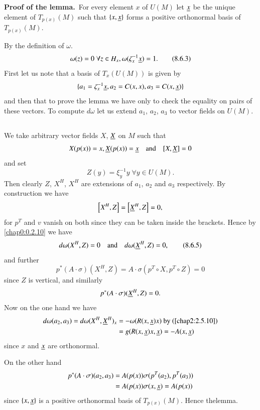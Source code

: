 \noindent
{\bf Proof of the lemma.}~For every element $x$ of $U(M)$ let $\underline{x}$
be the unique element of $T_{p(x)}(M)$ such that $\{x,\underline{x}\}$ forms
a positive orthonormal basis of $T_{p(x)}(M)$.

By the definition of $\omega$.
\begin{equation*}
\omega(z)=0 \; \forall z\in
H_{x},\omega(\zeta^{-1}_{x}\underline{x})=1.\tag{8.6.3}\label{chap8:8.6.3} 
\end{equation*}
First let us note that a basis of $T_{x}(U(M))$ is given by
$$
\{a_{1}=\zeta^{-1}_{x}\underline{x},a_{2}=C(x,x),a_{3}=C(x,\underline{x})\}
$$
and then that to prove the lemma we have only to check the equality on
pairs of these vectors. To compute $d\omega$ let us extend $a_{1}$,
$a_{2}$, $a_{3}$ to vector fields on $U(M)$. 

\setcounter{subsection}{3}
\subsection{}\label{chap8:8.6.4}\pageoriginale
We take arbitrary vector fields $X$, $\underline{X}$ on $M$ such that
$$
X(p(x))=x,\underline{X}(p(x))=\underline{x}\quad\text{and}\quad [X,\underline{X}]=0
$$
and set
$$
Z(y)=\xi^{-1}_{y}y \; \forall y \in U(M).
$$
Then clearly $Z$, $X^{H}$, $X^{H}$ are extensions of $a_{1}$, $a_{2}$
and $a_{3}$ respectively. By construction we have
$$
\left[X^{H},Z\right]=\left[\underline{X}^{H},Z\right]=0,
$$
for $p^{T}$ and $v$ vanish on both since they can be taken inside the
brackets. Hence by \eqref{chap0:0.2.10} we have
\begin{equation*}
d\omega(X^{H},Z)=0\quad\text{and}\quad
d\omega(\underline{X}^{H},Z)=0,\tag{8.6.5}\label{chap8:8.6.5} 
\end{equation*}
and further
$$
p^{\ast}(A\cdot\sigma)(X^{H},Z)=A\cdot \sigma(p^{T}\circ X,p^{T}\circ
Z)=0
$$
since $Z$ is vertical, and similarly
$$
p^{\ast}(A\cdot\sigma)(\underline{X}^{H},Z)=0.
$$
Now on the one hand we have
\begin{align*}
d\omega(a_{2},a_{3})=d\omega(X^{H},\underline{X}^{H})_{x} &=
-\omega(R(x,\underline{x})x)\text{ by (\ref{chap2:2.5.10})}\\
&= g(R(x,\underline{x})x,\underline{x})=-A(x,\underline{x})
\end{align*}
since $x$ and $\underline{x}$ are orthonormal.

On the other hand
\begin{align*}
p^{\ast}(A\cdot\sigma)(a_{2},a_{3}) &=
A(p(x))\sigma(p^{T}(a_{2}),p^{T}(a_{3}))\\
&= A(p(x))\sigma(x,\underline{x})=A(p(x))
\end{align*}
since $\{x,\underline{x}\}$ is a positive orthonormal basis of
$T_{p(x)}(M)$. Hence the\break lemma.

